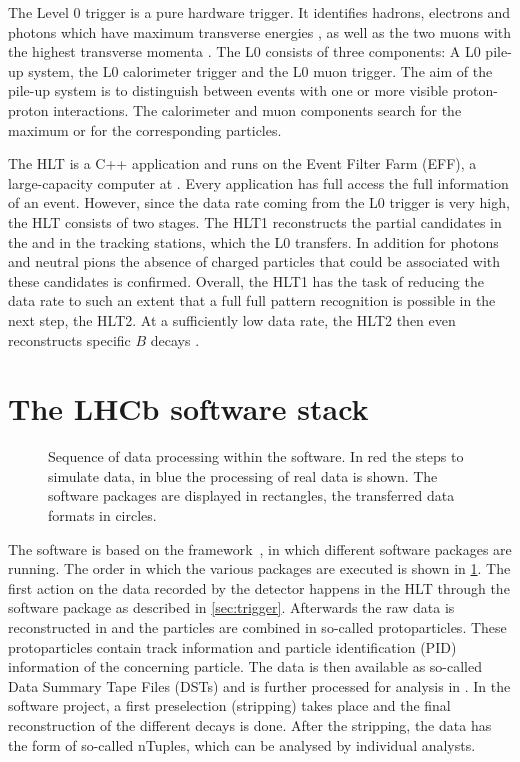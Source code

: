 The Level 0 trigger is a pure hardware trigger.
It identifies hadrons, electrons and photons which have maximum transverse energies \et, as well as the two muons with the highest transverse momenta \pt.
The L0 consists of three components: A L0 pile-up system, the L0 calorimeter trigger and the L0 muon trigger.
The aim of the pile-up system is to distinguish between events with one or more visible proton-proton interactions.
The calorimeter and muon components search for the maximum \et or \pt for the corresponding particles.

The HLT is a C++ application and runs on the Event Filter Farm (EFF), a large-capacity computer at \cern.
Every application has full access the full information of an event.
However, since the data rate coming from the L0 trigger is very high, the HLT consists of two stages.
The HLT1 reconstructs the partial candidates in the \velo and in the tracking stations, which the L0 transfers.
In addition for photons and neutral pions the absence of charged particles that could be associated with these candidates is confirmed.
Overall, the HLT1 has the task of reducing the data rate to such an extent that a full full pattern recognition is possible in the next step, the HLT2.
At a sufficiently low data rate, the HLT2 then even reconstructs specific $B$ decays .

\newpage

\section{The LHCb software stack}

\begin{figure}[tbp]
    \centering
    
    \caption{Sequence of data processing within the \lhcb software.
    In red the steps to simulate data, in blue the processing of real data is shown.
    The software packages are displayed in rectangles, the transferred data formats in circles.}
    \label{fig:lhcbsoftware}
\end{figure}
The \lhcb software is based on the \gaudi framework~\cite{Barrand:2001ny}, in which different software packages are running.
The order in which the various packages are executed is shown in \cref{fig:lhcbsoftware}.
The first action on the data recorded by the detector happens in the HLT through the software package \moore \cite{Aaij:2012me, Albrecht:2013fba} as described in \cref{sec:trigger}.
Afterwards the raw data is reconstructed in \brunel \cite{Szumlak:2007zz, VanderEijk:2001wqa, Kucharczyk:1756296} and the particles are combined in so-called protoparticles.
These protoparticles contain track information and particle identification (PID) information of the concerning particle.
The data is then available as so-called Data Summary Tape Files (DSTs) and is further processed for analysis in \davinci.
In the \davinci software project, a first preselection (stripping) takes place and the final reconstruction of the different decays is done.
After the stripping, the data has the form of so-called nTuples, which can be analysed by individual analysts.

